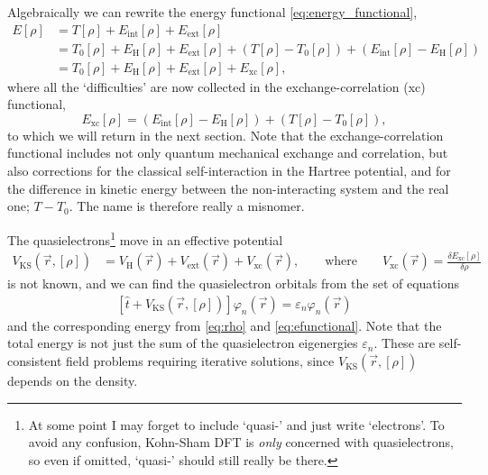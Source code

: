 \documentclass[11pt,bibliography=totoc,index=totoc]{scrbook}   %
\begin{document}
Algebraically we can rewrite the energy functional \eqref{eq:energy_functional},
\begin{align}
    E[\rho] &= T[\rho] + E_{\text{int}}[\rho] + E_{\text{ext}}[\rho] \\
    &= T_0[\rho] + E_{\text{H}}[\rho] + E_{\text{ext}}[\rho] + (T[\rho] - T_0[\rho]) + (E_{\text{int}}[\rho]-E_{\text{H}}[\rho])  \\
    &= T_0[\rho] + E_{\text{H}}[\rho] + E_{\text{ext}}[\rho] + E_{\text{xc}}[\rho],\label{eq:efunctional}
\end{align}
where all the `difficulties' are now collected in the exchange-correlation (xc) functional,
\begin{equation}
    E_{\text{xc}}[\rho] = (E_{\text{int}}[\rho] - E_{\text{H}}[\rho]) + (T[\rho]-T_0[\rho]),
  \label{eq:E_eeKS}
\end{equation}
to which we will return in the next section. 
Note that the exchange-correlation functional includes not only quantum mechanical exchange and correlation, 
but also corrections for the classical self-interaction in the Hartree potential,
and for the difference in kinetic energy between the non-interacting system and the real one; $T-T_0$.
The name is therefore really a misnomer.\cite[256]{Cramer:2004}

The quasielectrons\footnote{At some point I may forget to include `quasi-' and just write `electrons'.
    To avoid any confusion, Kohn-Sham DFT is \emph{only} concerned with quasielectrons, so even if omitted, `quasi-' should still really be there.}
    move in an effective potential
\begin{align}
    V_{\text{KS}}(\vec{r},[\rho]) &= V_{\text{H}}(\vec{r}) + V_{\text{ext}}(\vec{r}) + V_{\text{xc}}(\vec{r}),\qquad\text{where}\qquad
    V_{\text{xc}}(\vec{r}) = \frac{\delta E_{\text{xc}}[\rho]}{\delta \rho}
  \label{eq:v_eff}
\end{align}
is not known, and we can find the quasielectron orbitals from the set of equations
\begin{align}
    \left[\hat{t} + V_{\text{KS}}(\vec{r},[\rho])\right] \varphi_n(\vec{r}) = \varepsilon_n \varphi_n(\vec{r})
    \label{eq:KS}
\end{align}
and the corresponding energy from \eqref{eq:rho} and \eqref{eq:efunctional}.
Note that the total energy is not just the sum of the quasielectron eigenergies $\varepsilon_n$.
These are self-consistent field problems requiring iterative solutions, since $V_{\text{KS}}(\vec{r},[\rho])$ depends on the density.
\end{document}
